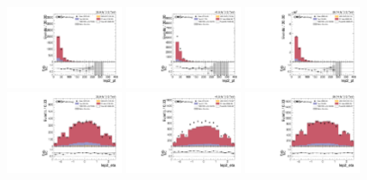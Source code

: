 \begin{figure}[!ht]
  \centering
  \includegraphics[width=0.30\textwidth]{analysis_plots/2016_zjj/cr_vjets_e/lep2_pt.pdf}
  \includegraphics[width=0.30\textwidth]{analysis_plots/2017_zjj/cr_vjets_e/lep2_pt.pdf}
  \includegraphics[width=0.30\textwidth]{analysis_plots/2018_zjj/cr_vjets_e/lep2_pt.pdf} \\
  \includegraphics[width=0.30\textwidth]{analysis_plots/2016_zjj/cr_vjets_e/lep2_eta.pdf}
  \includegraphics[width=0.30\textwidth]{analysis_plots/2017_zjj/cr_vjets_e/lep2_eta.pdf}
  \includegraphics[width=0.30\textwidth]{analysis_plots/2018_zjj/cr_vjets_e/lep2_eta.pdf} \\

\end{figure}
